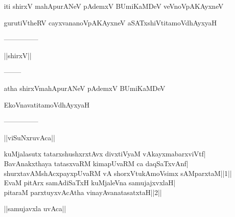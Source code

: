 \documentclass{article}
\begin{document}
\begin{center}
iti shirxV mahApurANeV pAdemxV BUmiKaMDeV veVnoVpAKAyxneV
\end{center}

\begin{center}
gurutiVtheRV cayxvananoVpAKAyxneV aSATxshiVtitamoVdhAyxyaH
\end{center}

\begin{center}
---------------
\end{center}

\begin{center}
||shirxV||
\end{center}

\begin{center}
--------
\end{center}

\begin{center}
atha shirxVmahApurANeV pAdemxV BUmiKaMDeV
\end{center}

\begin{center}
EkoVnavatitamoVdhAyxyaH
\end{center}

\begin{center}
---------------
\end{center}

\begin{center}
||viSuNxruvAca||
\end{center}

kuMjalasutx tatarxshushxrxtAvx divxtiVyaM vAkayxmabarxviVtf|\\
BavAnakxthaya tatasxvaRM kimapUvaRM ca daqSaTxvAnf|\\
shurxtavAMshAcxpayxpUvaRM vA shorxVtukAmoVsimx sAMparxtaM||1||\\
EvaM pitArx samAdiSaTxH kuMjaleVna samujajxvxlaH|\\
pitaraM parxtuyxvAcAtha vinayAvanatasatxtaH||2||\\

\begin{center}
||samujavxla uvAca||
\end{center}
\end{document}
